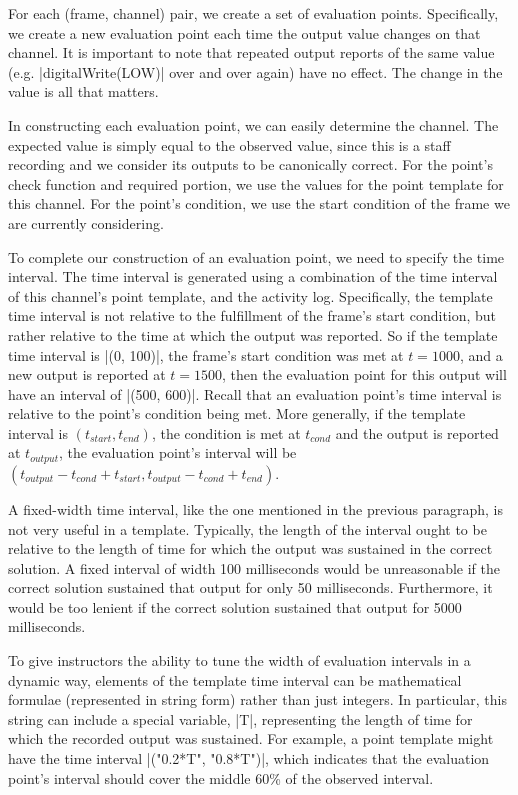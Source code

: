 \documentclass[12pt]{article}
\begin{document}
For each (frame, channel) pair, we create a set of evaluation points.  Specifically, we create a new evaluation point each time the output value changes on that channel.  It is important to note that repeated output reports of the same value (e.g. |digitalWrite(LOW)| over and over again) have no effect.  The change in the value is all that matters.

In constructing each evaluation point, we can easily determine the channel.  The expected value is simply equal to the observed value, since this is a staff recording and we consider its outputs to be canonically correct.   For the point's check function and required portion, we use the values for the point template for this channel.  For the point's condition, we use the start condition of the frame we are currently considering.

To complete our construction of an evaluation point, we need to specify the time interval.  The time interval is generated using a combination of the time interval of this channel's point template, and the activity log.  Specifically, the template time interval is not relative to the fulfillment of the frame's start condition, but rather relative to the time at which the output was reported.  So if the template time interval is |(0, 100)|, the frame's start condition was met at $t=1000$, and a new output is reported at $t=1500$, then the evaluation point for this output will have an interval of |(500, 600)|.  Recall that an evaluation point's time interval is relative to the point's condition being met.  More generally, if the template interval is $(t_{start}, t_{end})$, the condition is met at $t_{cond}$ and the output is reported at $t_{output}$, the evaluation point's interval will be $(t_{output} - t_{cond} + t_{start}, t_{output} - t_{cond} + t_{end})$.

A fixed-width time interval, like the one mentioned in the previous paragraph, is not very useful in a template.  Typically, the length of the interval ought to be relative to the length of time for which the output was sustained in the correct solution.  A fixed interval of width 100 milliseconds would be unreasonable if the correct solution sustained that output for only 50 milliseconds.  Furthermore, it would be too lenient if the correct solution sustained that output for 5000 milliseconds.

To give instructors the ability to tune the width of evaluation intervals in a dynamic way, elements of the template time interval can be mathematical formulae (represented in string form) rather than just integers.  In particular, this string can include a special variable, |T|, representing the length of time for which the recorded output was sustained.  For example, a point template might have the time interval |("0.2*T", "0.8*T")|, which indicates that the evaluation point's interval should cover the middle 60\% of the observed interval. 
\end{document}
